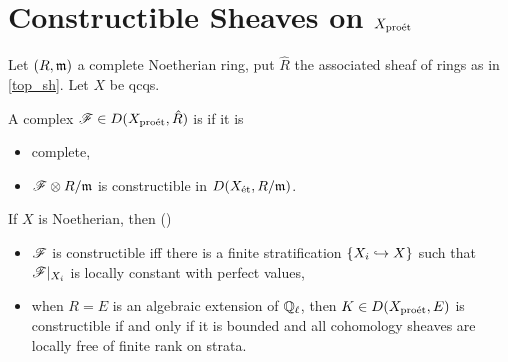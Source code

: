 \documentclass[oneside]{amsart}
\begin{document}
\section{\texorpdfstring{Constructible Sheaves on $X_{\mathrm{pro\acute{e}t}}$}{Constructible sheaves on Xproet}}
Let $(R,\mathfrak{m})$ a complete Noetherian ring, put $\hat{R}$ the associated sheaf of rings as
in \ref{top_sh}. Let $X$ be qcqs.
\begin{definition}[{\cite[definition 6.5.1]{BS}}]
	A complex $\mathscr{F}\in D(X_{\mathrm{pro\acute{e}t}},\hat{R})$ is  if it is
	\begin{itemize}
		\item complete,
		\item $\mathscr{F}\otimes R /\mathfrak{m}$ is constructible in $D(X_{\mathrm{\acute{e}t}},R /\mathfrak{m})$.
	\end{itemize}
\end{definition}
If $X$ is Noetherian, then (\cite[Proposition 6.6.11 and Definition 1.1]{BS})
\begin{itemize}
	\item $\mathscr{F}$ is constructible iff there is a finite stratification $\{X_i\hookrightarrow X\} $
		such that $\mathscr{F}|_{X_i}$ is locally constant with perfect values,
	\item when $R=E$ is an algebraic extension of $\mathbb Q_\ell$, then $K\in D(X_{\mathrm{pro\acute{e}t}}, E)$ is
		constructible if and only if it is bounded and all cohomology sheaves are locally free
		of finite rank on strata.
\end{itemize}
\end{document}
